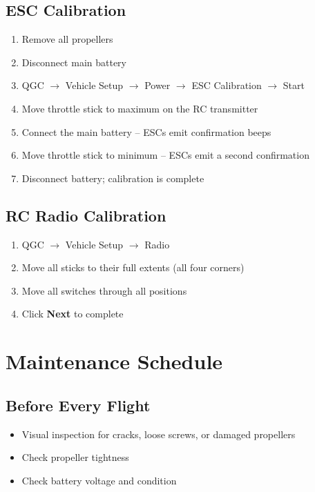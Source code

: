 \documentclass{article}
\begin{document}
\subsection*{ESC Calibration}
\begin{enumerate}
    \item Remove all propellers
    \item Disconnect main battery
    \item QGC $\rightarrow$ Vehicle Setup $\rightarrow$ Power $\rightarrow$ ESC Calibration $\rightarrow$ Start
    \item Move throttle stick to maximum on the RC transmitter
    \item Connect the main battery -- ESCs emit confirmation beeps
    \item Move throttle stick to minimum -- ESCs emit a second confirmation
    \item Disconnect battery; calibration is complete
\end{enumerate}

\subsection*{RC Radio Calibration}
\begin{enumerate}
    \item QGC $\rightarrow$ Vehicle Setup $\rightarrow$ Radio
    \item Move all sticks to their full extents (all four corners)
    \item Move all switches through all positions
    \item Click \textbf{Next} to complete
\end{enumerate}

\section{Maintenance Schedule}
\label{app:maintenance}

\subsection*{Before Every Flight}
\begin{itemize}
    \item Visual inspection for cracks, loose screws, or damaged propellers
    \item Check propeller tightness
    \item Check battery voltage and condition
\end{itemize}
\end{document}
